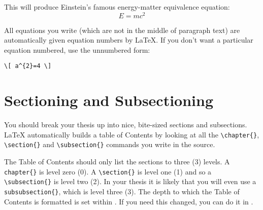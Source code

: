 This will produce Einstein's famous energy-matter equivalence equation:
\begin{equation}
    E = mc^{2}
    \label{eqn:Einstein}
\end{equation}

All equations you write (which are not in the middle of paragraph text) are
automatically given equation numbers by \LaTeX{}. If you don't want a
particular equation numbered, use the unnumbered form:
\begin{verbatim}
\[ a^{2}=4 \]
\end{verbatim}


\section{Sectioning and Subsectioning}

You should break your thesis up into nice, bite-sized sections and subsections.
\LaTeX{} automatically builds a table of Contents by looking at all the
\verb|\chapter{}|, \verb|\section{}| and \verb|\subsection{}| commands you
write in the source.

The Table of Contents should only list the sections to three (3) levels. A
\verb|chapter{}| is level zero (0). A \verb|\section{}| is level one (1) and so
a \verb|\subsection{}| is level two (2). In your thesis it is likely that you
will even use a \verb|subsubsection{}|, which is level three (3). The depth to
which the Table of Contents is formatted is set within
. If you need this changed, you can do it in
.



